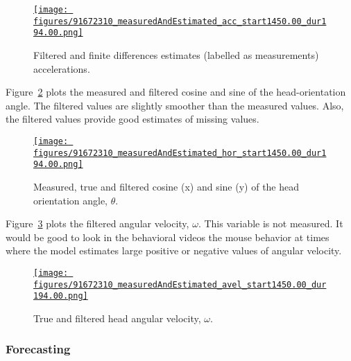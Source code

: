 \documentclass[12pt]{article}
\begin{document}
\begin{figure}
    \centering
    \href{https://www.gatsby.ucl.ac.uk/~rapela/aman/reports/ekfForKinematicsAndHeadOrientation/figures/91672310_measuredAndEstimated_acc_start1450.00_dur194.00.html}{\texttt{[image: figures/91672310\_measuredAndEstimated\_acc\_start1450.00\_dur194.00.png]}}

    \caption{Filtered and finite differences estimates
    (labelled as measurements) accelerations.}

    \label{fig:real_filtered_acc}
\end{figure}

Figure~\ref{fig:real_filtered_hor} plots the measured and filtered cosine
and sine of the head-orientation angle. The filtered values are slightly
smoother than the measured values. Also, the filtered values provide good
estimates of missing values.

\begin{figure}
    \centering
    \href{https://www.gatsby.ucl.ac.uk/~rapela/aman/reports/ekfForKinematicsAndHeadOrientation/figures/91672310_measuredAndEstimated_hor_start1450.00_dur194.00.html}{\texttt{[image: figures/91672310\_measuredAndEstimated\_hor\_start1450.00\_dur194.00.png]}}

    \caption{Measured, true and filtered cosine (x) and sine (y) of the head
    orientation angle, $\theta$.}

    \label{fig:real_filtered_hor}
\end{figure}

Figure~\ref{fig:real_filtered_avel} plots the filtered angular
velocity, $\omega$. This variable is not measured. It would be good to look in
the behavioral videos the mouse behavior at times where the model estimates
large positive or negative values of angular velocity.

\begin{figure}
    \centering
    \href{https://www.gatsby.ucl.ac.uk/~rapela/aman/reports/ekfForKinematicsAndHeadOrientation/figures/91672310_measuredAndEstimated_avel_start1450.00_dur194.00.html}{\texttt{[image: figures/91672310\_measuredAndEstimated\_avel\_start1450.00\_dur194.00.png]}}

    \caption{True and filtered head angular velocity, $\omega$.}

    \label{fig:real_filtered_avel}
\end{figure}

\subsubsection*{Forecasting}
\end{document}

